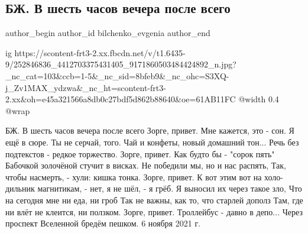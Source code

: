  
 
 
 
 
 
\subsection{БЖ. В шесть часов вечера после всего}
\label{sec:06_11_2021.fb.bilchenko_evgenia.2.v_shest_chasov_vechera}
 
\ifcmt
 author_begin
   author_id bilchenko_evgenia
 author_end
\fi

\ifcmt
  ig https://scontent-frt3-2.xx.fbcdn.net/v/t1.6435-9/252846836_4412703375431405_9171860503484424892_n.jpg?_nc_cat=103&ccb=1-5&_nc_sid=8bfeb9&_nc_ohc=S3XQ-j_Zv1MAX_ydzwa&_nc_ht=scontent-frt3-2.xx&oh=e45a321566a8db0c27bdf5d862b88640&oe=61AB11FC
  @width 0.4
  @wrap 
\fi

БЖ. В шесть часов вечера после всего
Зорге, привет. Мне кажется, это - сон.
Я ещё в сюре. Ты не серчай, того.
Чай и конфеты, новый домашний тон...
Речь без подтекстов - редкое торжество.
Зорге, привет. Как будто бы - "сорок пять"
Бабочкой золочёной стучит в висках.
Не победили мы, но и нас распять,
Так, чтобы насмерть, - хули: кишка тонка.
Зорге, привет. К вот этим вот на холо-
дильник магнитикам, - нет, я не шёл, - я грёб.
Я выносил их через такое зло,
Что на сегодня мне ни еда, ни гроб
Так не важны, как то, что старлей дополз
Там, где ни влёт не клеится, ни ползком.
Зорге, привет. Троллейбус - давно в депо...
Через проспект Вселенной бредём пешком.
6 ноября 2021 г.
